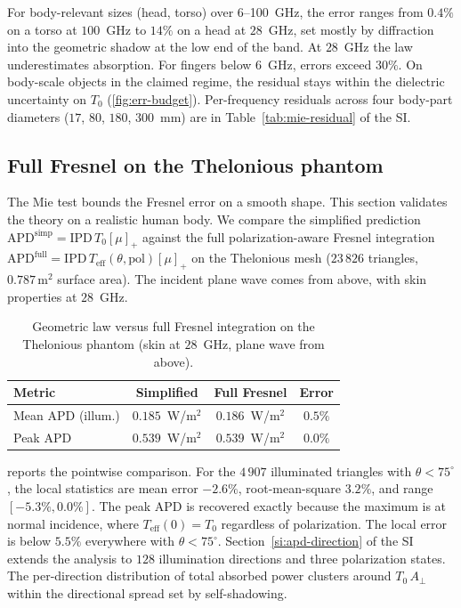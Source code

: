 \documentclass[journal,twocolumn,10pt]{IEEEtran}
\theoremstyle{plain}
\newcommand{\IPD}{\mathrm{IPD}}
\newcommand{\APD}{\mathrm{APD}}
\newcommand{\Aperp}{A_\perp}
\newcommand{\Teff}{T_{\mathrm{eff}}}
\newcommand{\pospart}[1]{\left[#1\right]_{+}}
\begin{document}
For body-relevant sizes (head, torso) over 6--100~GHz, the error ranges
from $0.4\%$ on a torso at $100$~GHz to $14\%$ on a head at
$28$~GHz, set mostly by diffraction into the geometric shadow at
the low end of the band. At $28$~GHz the law underestimates
absorption.
For fingers below 6~GHz, errors exceed $30\%$. On
body-scale objects in the claimed regime, the residual stays within
the dielectric uncertainty on $T_0$ (\cref{fig:err-budget}).
Per-frequency residuals across four body-part diameters ($17$, $80$,
$180$, $300$~mm) are in Table~\ref{tab:mie-residual} of the SI.

\subsection{Full Fresnel on the Thelonious phantom}\label{subsec:val-fresnel}

The Mie test bounds the Fresnel error on a smooth shape. This
section validates the theory on a realistic human body. We compare the simplified
prediction $\APD^{\mathrm{simp}} = \IPD\,T_0 \pospart{\mu}$ against
the full polarization-aware Fresnel integration $\APD^{\mathrm{full}}
= \IPD\,\Teff(\theta, \mathrm{pol}) \pospart{\mu}$ on the Thelonious
mesh ($23\,826$ triangles, $0.787\,\mathrm{m}^2$ surface area). The
incident plane wave comes from above, with skin properties at
$28$~GHz.

\begin{table}[!t]
\centering
\caption{Geometric law versus full Fresnel integration on the
Thelonious phantom (skin at $28$~GHz, plane wave from above).}
\label{tab:phantom}
\begin{tabular}{lccc}
\toprule
Metric & Simplified & Full Fresnel & Error \\
\midrule
Mean $\APD$ (illum.)     & $0.185$~W/m$^2$ & $0.186$~W/m$^2$ & $0.5\%$ \\
Peak $\APD$              & $0.539$~W/m$^2$ & $0.539$~W/m$^2$ & $0.0\%$ \\
\bottomrule
\end{tabular}
\end{table}

 reports the pointwise comparison. For the
$4\,907$ illuminated triangles with
$\theta < 75^\circ$, the local statistics are mean error $-2.6\%$,
root-mean-square $3.2\%$, and range $[-5.3\%, 0.0\%]$. The peak
$\APD$ is recovered exactly because the maximum is at normal incidence,
where $\Teff(0) = T_0$ regardless of polarization. The local error is
below $5.5\%$ everywhere with $\theta < 75^\circ$.
Section~\ref{si:apd-direction} of the SI extends the analysis to
$128$ illumination directions and three polarization states. The
per-direction distribution of total absorbed power clusters around
$T_0\,\Aperp$ within the directional spread set by self-shadowing.
\end{document}
